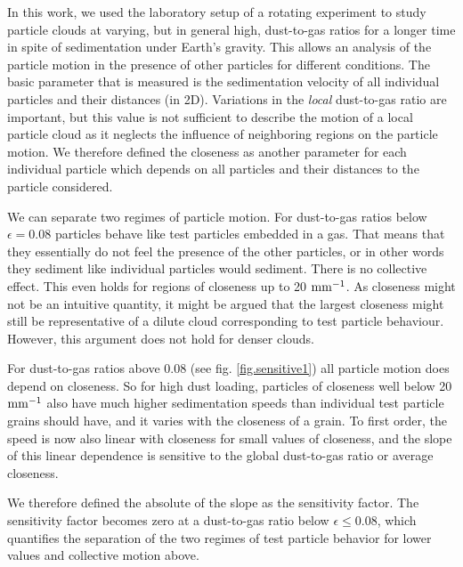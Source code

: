In this work, we used the laboratory setup of a rotating experiment to study particle clouds at varying, but in general high, dust-to-gas ratios for a longer time in spite of sedimentation under Earth's gravity.
This allows an analysis of the particle motion in the presence of other particles for different conditions. 
The basic parameter that is measured is the sedimentation velocity of all individual particles and their distances (in 2D).
Variations in the \textit{local} dust-to-gas ratio are important, but this value is not sufficient to describe the motion of a local particle cloud as it neglects the influence of neighboring regions on the particle motion. We therefore defined the closeness as another parameter for each individual particle which depends on all particles and their distances 
to the particle considered.

We can separate two regimes of particle motion.
For dust-to-gas ratios below $\epsilon = 0.08$ particles behave like test particles embedded in a gas. That means that they essentially do not feel the presence of the other particles, or in other words they sediment like individual particles would sediment. There is no collective effect. This even holds for regions of closeness up to 20 $\rm mm^{-1}$. 
As closeness might not be an intuitive quantity, it might be argued that the largest closeness might still be representative of a dilute cloud corresponding to test particle behaviour. However, this argument does not hold for denser clouds.

For dust-to-gas ratios above 0.08 {(see fig. \ref{fig.sensitive1})} all particle motion does depend on closeness. So for
high dust loading, particles of closeness well below 20 $\rm mm^{-1}$ also have much higher sedimentation speeds than individual test particle grains should have, and it varies with the closeness of a grain. 
To first order, the speed is now also linear {with} closeness for small values of closeness, and the {slope} of this linear dependence is sensitive to the global dust-to-gas ratio or average closeness. 

We therefore defined the absolute of the {slope} as the sensitivity factor.
The sensitivity factor becomes zero at a dust-to-gas ratio below $\epsilon \le 0.08$, which quantifies the
separation of the two regimes of test particle behavior for lower values and collective
motion above.

